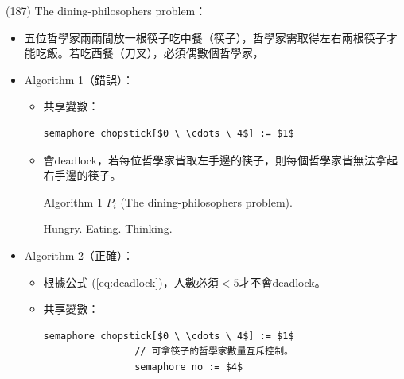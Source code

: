 \begin{theorem}{(187)} The dining-philosophers problem：\begin{itemize}
        \item 五位哲學家兩兩間放一根筷子吃中餐（筷子），哲學家需取得左右兩根筷子才能吃飯。若吃西餐（刀叉），必須偶數個哲學家，
        \item Algorithm 1（錯誤）：\begin{itemize}
            \item 共享變數：\begin{lstlisting}[caption={Shared variables of The dining-philosophers problem.}, captionpos=b, mathescape=true]
                semaphore chopstick[$0 \ \cdots \ 4$] := $1$
            \end{lstlisting}
            \item 會deadlock，若每位哲學家皆取左手邊的筷子，則每個哲學家皆無法拿起右手邊的筷子。
            \begin{algorithm}[H]
                \caption{Algorithm 1 $P_i$ (The dining-philosophers problem).}
                \label{algo:din-philo-algo-1}
                \begin{algorithmic}[1]
                        \Repeat
                            \State Hungry.
                            \State {}
                            \State {}
                            \State Eating.
                            \State {}
                            \State {}
                            \State Thinking.
                    \EndFunction
                \end{algorithmic}
            \end{algorithm}
        \end{itemize}
        \item Algorithm 2（正確）：\begin{itemize}
            \item 根據公式 (\ref{eq:deadlock})，人數必須$< 5$才不會deadlock。
            \item 共享變數：\begin{lstlisting}[caption={Shared variables of The dining-philosophers problem.}, captionpos=b, mathescape=true]
                semaphore chopstick[$0 \ \cdots \ 4$] := $1$ 
                // 可拿筷子的哲學家數量互斥控制。
                semaphore no := $4$ 

\end{lstlisting}
\end{itemize}
\end{itemize}
\end{theorem}
